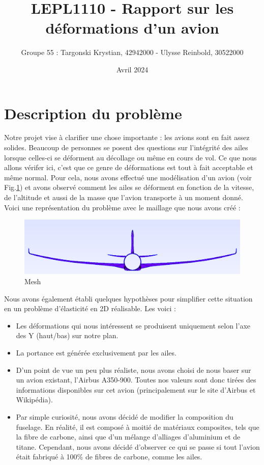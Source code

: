 \documentclass{article}
\title{LEPL1110 - Rapport sur les déformations d'un avion}
\author{Groupe 55 : Targonski Krystian, 42942000 - Ulysse Reinbold, 30522000}
\date{Avril 2024}
\begin{document}
\maketitle

\section{Description du problème}
    Notre projet vise à clarifier une chose importante : les avions sont en fait assez solides. Beaucoup de personnes se posent des questions sur l'intégrité des ailes lorsque celles-ci se déforment au décollage ou même en cours de vol. Ce que nous allons vérifer ici, c'est que ce genre de déformations est tout à fait acceptable et même normal. Pour cela, nous avons effectué une modélisation d'un avion (voir Fig.\ref{fig:mesh_mauve}) et avons observé comment les ailes se déforment en fonction de la vitesse, de l'altitude et aussi de la masse que l'avion transporte à un moment donné. Voici une représentation du problème avec le maillage que nous avons créé :
    \begin{center}
        \begin{figure}[h]
            \centering
            \includegraphics[scale=0.3]{Screenshot from 2024-04-12 15-27-26.png}
            \caption{Mesh}
            \label{fig:mesh_mauve}
        \end{figure}
    \end{center}

    Nous avons également établi quelques hypothèses pour simplifier cette situation en un problème d'élasticité en 2D réalisable. Les voici : 
    \begin{itemize}
        \item Les déformations qui nous intéressent se produisent uniquement selon l'axe des Y (haut/bas) sur notre plan.
        \item La portance est générée exclusivement par les ailes.
        \item D'un point de vue un peu plus réaliste, nous avons choisi de nous baser sur un avion existant, l'Airbus A350-900. Toutes nos valeurs sont donc tirées des informations disponibles sur cet avion (principalement sur le site d'Airbus et Wikipédia).
        \item Par simple curiosité, nous avons décidé de modifier la composition du fuselage. En réalité, il est composé à moitié de matériaux composites, tels que la fibre de carbone, ainsi que d’un mélange d'alliages d'aluminium et de titane. Cependant, nous avons décidé d'observer ce qui se passe si tout l'avion était fabriqué à 100\% de fibres de carbone, comme les ailes.
\end{itemize}
    
\end{document}
